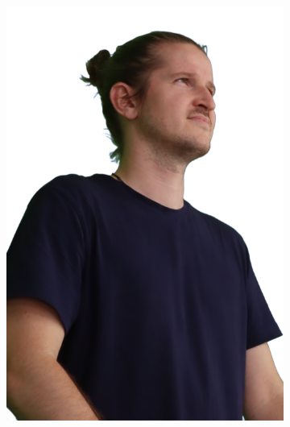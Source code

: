 \begin{figure}
\begin{subfigure}{0.18\linewidth}
        \includegraphics[width=\textwidth]{Figures/results/splatfacto_ex/21_render.png}

\end{subfigure}
\end{figure}
